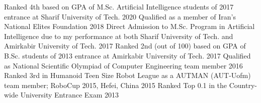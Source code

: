 

\begin{cvhonors}
    \cvhonor
    {Ranked 4th} %
    {based on GPA of M.Sc. Artificial Intelligence students of 2017 entrance at Sharif University of Tech.} %
    {} %
    {2020} %
    \cvhonor
    {Qualified} %
    {as a member of Iran's National Elites Foundation} %
    {} %
    {2018} %
	\cvhonor
	{Direct Admission to M.Sc. Program} %
	{in Artificial Intelligence due to my performance at both Sharif University of Tech. and Amirkabir University of Tech.} %
	{} %
	{2017} %
	\cvhonor
	{Ranked 2nd} %
	{(out of 100) based on GPA of B.Sc. students of 2013 entrance at Amirkabir University of Tech.} %
	{} %
	{2017} %
	\cvhonor
	{Qualified} %
	{as National Scientific Olympiad  of Computer Engineering team member} %
	{} %
	{2016} %
    \cvhonor
    {Ranked 3rd} %
    {in Humanoid Teen Size Robot League as a AUTMAN (AUT-Uofm) team member; RoboCup 2015, Hefei, China} %
    {} %
    {2015} %
	\cvhonor
	{Ranked Top 0.1} %
	{in the Country-wide University Entrance Exam} %
	{} %
	{2013} %
\end{cvhonors}
